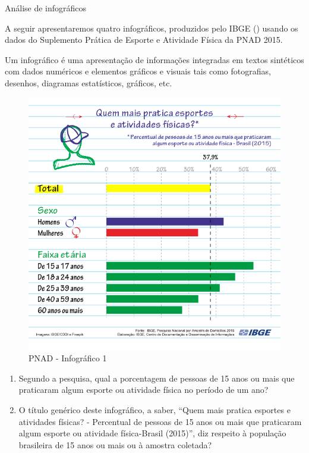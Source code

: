 \label{\detokenize{PE103-0:ativ4-analise-de-infograficos}}
\begin{task}{ Análise de infográficos}

A seguir apresentaremos quatro infográficos, produzidos pelo IBGE () usando os dados do Suplemento Prática de Esporte e Atividade Física da PNAD 2015.

Um infográfico é uma apresentação de informações integradas em textos sintéticos com dados numéricos e elementos gráficos e visuais tais como fotografias, desenhos, diagramas estatísticos, gráficos, etc.

\begin{figure}[H]
\centering
\capstart

\noindent\includegraphics[width=300bp]{PNAD_2015_Esportes_01quem2.png}
\caption{PNAD - Infográfico 1}\label{\detokenize{PE103-0:fig-infografico-pnad-1}}\label{\detokenize{PE103-0:id1}}\end{figure}
\begin{enumerate}
\item {} 
Segundo a pesquisa, qual a porcentagem de pessoas de 15 anos ou mais que praticaram algum esporte ou atividade física no período de um ano?

\item {} 
O título genérico deste infográfico, a saber, ``Quem mais pratica esportes e atividades físicas? - Percentual de pessoas de 15 anos ou mais que praticaram algum esporte ou atividade física-Brasil (2015)'', diz respeito à população brasileira de 15 anos ou mais ou à amostra coletada?


\end{enumerate}
\end{task}
